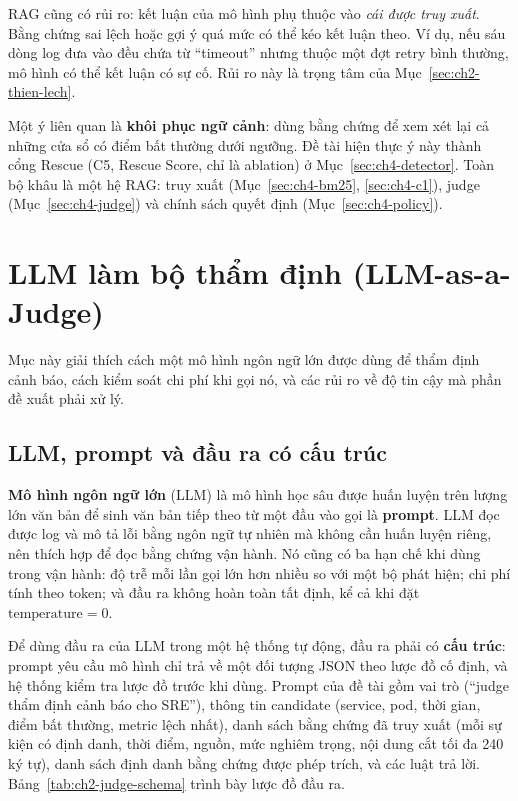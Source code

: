 RAG cũng có rủi ro: kết luận của mô hình phụ thuộc vào \emph{cái được truy xuất}. Bằng chứng sai lệch hoặc gợi ý quá mức có thể kéo kết luận theo. Ví dụ, nếu sáu dòng log đưa vào đều chứa từ ``timeout'' nhưng thuộc một đợt retry bình thường, mô hình có thể kết luận có sự cố. Rủi ro này là trọng tâm của Mục~\ref{sec:ch2-thien-lech}.

Một ý liên quan là \textbf{khôi phục ngữ cảnh}: dùng bằng chứng để xem xét lại cả những cửa sổ có điểm bất thường dưới ngưỡng. Đề tài hiện thực ý này thành cổng Rescue (C5, Rescue Score, chỉ là ablation) ở Mục~\ref{sec:ch4-detector}. Toàn bộ khâu \CTAV{} là một hệ RAG: truy xuất (Mục~\ref{sec:ch4-bm25}, \ref{sec:ch4-c1}), judge (Mục~\ref{sec:ch4-judge}) và chính sách quyết định (Mục~\ref{sec:ch4-policy}).

\section{LLM làm bộ thẩm định (LLM-as-a-Judge)}
\label{sec:ch2-judge}

Mục này giải thích cách một mô hình ngôn ngữ lớn được dùng để thẩm định cảnh báo, cách kiểm soát chi phí khi gọi nó, và các rủi ro về độ tin cậy mà phần đề xuất phải xử lý.

\subsection{LLM, prompt và đầu ra có cấu trúc}
\label{sec:ch2-prompt}

\textbf{Mô hình ngôn ngữ lớn} (LLM) là mô hình học sâu được huấn luyện trên lượng lớn văn bản để sinh văn bản tiếp theo từ một đầu vào gọi là \textbf{prompt}. LLM đọc được log và mô tả lỗi bằng ngôn ngữ tự nhiên mà không cần huấn luyện riêng, nên thích hợp để đọc bằng chứng vận hành. Nó cũng có ba hạn chế khi dùng trong vận hành: độ trễ mỗi lần gọi lớn hơn nhiều so với một bộ phát hiện; chi phí tính theo token; và đầu ra không hoàn toàn tất định, kể cả khi đặt $\text{temperature} = 0$.

Để dùng đầu ra của LLM trong một hệ thống tự động, đầu ra phải có \textbf{cấu trúc}: prompt yêu cầu mô hình chỉ trả về một đối tượng JSON theo lược đồ cố định, và hệ thống kiểm tra lược đồ trước khi dùng. Prompt của đề tài gồm vai trò (``judge thẩm định cảnh báo cho SRE''), thông tin candidate (service, pod, thời gian, điểm bất thường, metric lệch nhất), danh sách bằng chứng đã truy xuất (mỗi sự kiện có định danh, thời điểm, nguồn, mức nghiêm trọng, nội dung cắt tối đa 240 ký tự), danh sách định danh bằng chứng được phép trích, và các luật trả lời. Bảng~\ref{tab:ch2-judge-schema} trình bày lược đồ đầu ra.

